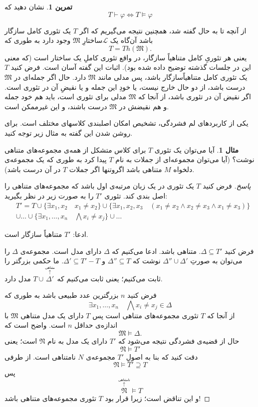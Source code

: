 \documentclass[12pt,a4paper]{article}
\theoremstyle{definition}
\newtheorem{mesal}[thm]{مثال}
\newtheorem{tamrin}{تمرین}
\begin{document}
	\begin{tamrin}
		نشان دهید که 		\[ T\vdash\varphi \iff T\models \varphi \]
	
	\end{tamrin}
از 
آنچه تا به حال گفته شد، همچنین نتیجه می‌گیریم که 
		اگر 
		$ T $
		یک تئوری کامل سازگار باشد آن‌گاه یک
		$ \mathcal{L} $ساختارِ
		$ \mathfrak{M} $
		وجود دارد به طوری که
		\[ T=Th(\mathfrak{M}). \]
	یعنی هر تئوریِ کامل متناهیاً سازگار، در واقع تئوری کاملِ یک ساختار است (که معنی این در جلسات گذشته توضیح داده شده بود). اثبات این گفته آسان است. فرض کنید
	$T$
	یک تئوری کامل متناهیاًسازگار باشد، پس مدلی مانند
	$\mathfrak{M}$
	دارد. حال اگر جمله‌‌ای در
	$\mathfrak{M}$
	درست باشد، از دو حال خارج نیست، یا خودِ این جمله و یا نقیضِ آن در تئوری است. اگر نقیض آن در تئوری باشد، از آنجا که
	$\mathfrak{M}$
	مدلی برای تئوری است، باید هم خود جمله و هم نقیضش در
	$\mathfrak{M}$
	درست باشند، و این غیرممکن است. 
	\par 
	یکی از کاربردهای لم فشردگی، تشخیص امکان اصلبندی کلاسهای مختلف است. برای روشن شدن این گفته به مثال زیر توجه کنید.
	\begin{mesal}
		آیا می‌توان یک تئوری 
		$ T $
		برای کلاس متشکل از همه‌ی مجموعه‌های متناهی نوشت؟ (آیا می‌توان مجموعه‌‌ای از جملات به نام 
		$ T $
		پیدا کرد به طوری که 
		یک مجموعه‌ی دلخواه 
		$M$
		متناهی باشد اگروتنها 
		اگر جملات
		$T$
		در آن درست باشد).
	\end{mesal}
	\begin{proof}[پاسخ]
		فرض کنید 
		$ T $
		یک تئوری در یک زبان مرتبه‌ی اول باشد که مجموعه‌های متناهی را اصل بندی کند. تئوری
		$ T' $
		را به صورت زیر در نظر بگیرید:
		\begin{align*}
		&T'=T\cup \{\exists x_1, x_2 \quad x_1\neq x_2\}\cup \{\exists x_1, x_2,x_3 \quad (x_1\neq x_2 \wedge x_2\neq x_3 \wedge x_1\neq x_3)\}\\
		& \cup \ldots \cup \{\exists x_1,\ldots, x_n \quad \bigwedge x_i\neq x_j\}\cup \ldots
		\end{align*}

		ادعا:
		$ T' $
		متناهیاً سازگار است.
		\newline

		فرض کنید 
		$ \Delta \subseteq T' $.
	متناهی باشد. 
	ادعا می‌کنیم که
	$\Delta$
	دارای مدل است.
	مجموعه‌ی
	$\Delta$
	را می‌توان به صورتِ
	$\Delta''\cup \Delta'$
	نوشت که 
	$\Delta''\subseteq T$
	و
	$\Delta'\subseteq T'-T$.
	ما حکمی بزرگتر را ثابت می‌کنیم؛ یعنی ثابت می‌کنیم که 
		$ T\cup \stackrel{\stackrel{\text{متناهی}}{\uparrow}}{\Delta'} $
	مدل دارد.
	\par 
		فرض کنید 
		$ n $
		بزرگترین عدد طبیعی باشد به طوری که
		\[ \exists x_1,\ldots,x_n \quad \bigwedge x_i \neq x_j \in \Delta \]
		از آنجا که 
		$ T $
		تئوری مجموعه‌های متناهی است پس 
		$ T $
		دارای یک مدل متناهی 
		$ \mathfrak{M} $
		با اندازه‌ی حداقل 
		$ n $
		است. واضح است که
		\[ \mathfrak{M} \models \Delta. \]
حال از قضیه‌ی فشردگی نتیجه می‌شود که
		$ T' $
		دارای یک مدل به نام 
		$ \mathfrak{N} $
		است؛ یعنی
		\[ \mathfrak{N} \models T' \]
		دقت کنید  که بنا به اصولِ
		$T'$
		مجموعه‌ی
		$ N $
		نامتناهی است. از طرفی 
		\[ \mathfrak{N} \models T' \supseteq T \]
		پس 
		\[ \stackrel{\stackrel{\text{نامتناهی}}{\uparrow}}{\mathfrak{N}} \models T \]
و این تناقض است؛ زیرا قرار بود
		 $ T $
		 تئوری مجموعه‌های متناهی باشد!
	\end{proof}
\end{document}

